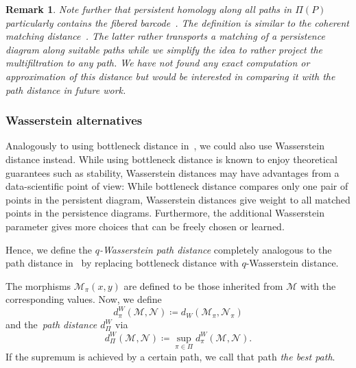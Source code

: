 \documentclass[sigconf, nonacm, natbib=false]{acmart} %
\def\M {{\mathcal{M}}}
\def\N {{\mathcal{N}}}
\def\path{\pi}
\def\pathset{\Pi}
\def\pathdist{d_{\pathset}}
\let\svtodo\todo
\renewcommand\todo[1]{\svtodo[inline]{#1}}
\newcommand{\XS}[1]{\todo{XS:~#1}}
\theoremstyle{plain}
\newtheorem{remark}{Remark}
\begin{document}
\begin{remark}
Note further that persistent homology along all paths in $\pathset(P)$ particularly contains the fibered barcode~\cite{Lesnick2015}.
    The definition is similar to the coherent matching distance~\cite{cerri2019geometrical}. 
    The latter rather transports a matching of a persistence diagram along suitable paths while we simplify the idea to rather project the multifiltration to any path. 
    We have not found any exact computation or approximation of this distance but would be interested in comparing it with the path distance in future work. %
\end{remark}

\subsubsection{Wasserstein alternatives}\label{rem:wasserstein}
Analogously to using bottleneck distance in~, we could also use Wasserstein distance instead. While using bottleneck distance is known to enjoy theoretical guarantees such as stability, Wasserstein distances may have advantages from a data-scientific point of view: 
While bottleneck distance compares only one pair of points in the persistent diagram, Wasserstein distances give weight to all matched points in the persistence diagrams.
Furthermore, the additional Wasserstein parameter gives more choices that can be freely chosen or learned.%

Hence, we define the \emph{$q$-Wasserstein path distance} completely analogous to the path distance in~ by replacing bottleneck distance with $q$-Wasserstein distance.
\begin{definition}\label{def:path_bottleneck_dist}
The morphisms $\M_\pi(x,y)$ are defined to be those inherited from $\M$ with the corresponding values.
Now, we define
\begin{equation}
d_\pi^W(\M,\N) \coloneqq d_W(\M_\path,\N_\path)  
\end{equation}
and the~\emph{path distance $\pathdist^W$} via 
\begin{equation}
\pathdist^W(\M,\N) \coloneqq \sup_{\path\in\pathset} d^W_\path(\M,\N).
\end{equation}
If the supremum is achieved by a certain path, we call that path \emph{the best path}. 
\end{definition}
\end{document}
